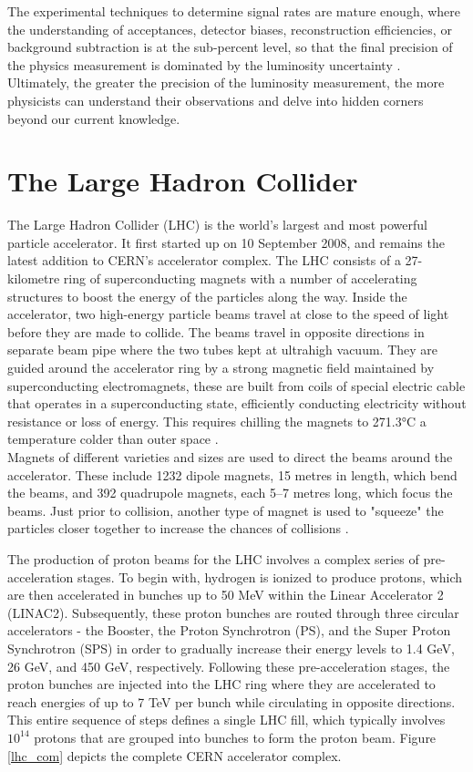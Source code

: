 The experimental techniques to determine signal rates are mature enough, where the understanding of acceptances, detector biases, reconstruction efficiencies, or background subtraction is at the sub-percent level, so that the final precision of the physics measurement is dominated by the luminosity uncertainty \cite{lumi_paper_def_and_concept}.\\
Ultimately, the greater the precision of the luminosity measurement, the more physicists can understand their observations and delve into hidden corners beyond our current knowledge.

\section{The Large Hadron Collider}

The Large Hadron Collider (LHC) is the world’s largest and most powerful particle accelerator. It first started up on 10 September 2008, and remains the latest addition to CERN’s accelerator complex. The LHC consists of a 27-kilometre ring of superconducting magnets with a number of accelerating structures to boost the energy of the particles along the way. Inside the accelerator, two high-energy particle beams travel at close to the speed of light before they are made to collide. The beams travel in opposite directions in separate beam pipe where the two tubes kept at ultrahigh vacuum. They are guided around the accelerator ring by a strong magnetic field maintained by superconducting electromagnets, these are built from coils of special electric cable that operates in a superconducting state, efficiently conducting electricity without resistance or loss of energy. This requires chilling the magnets to 271.3°C  a temperature colder than outer space \cite{LHC}.\\ 
Magnets of different varieties and sizes are used to direct the beams around the accelerator. These include 1232 dipole magnets, 15 metres in length, which bend the beams, and 392 quadrupole magnets, each 5–7 metres long, which focus the beams. Just prior to collision, another type of magnet is used to "squeeze" the particles closer together to increase the chances of collisions . 

The production of proton beams for the LHC involves a complex series of pre-acceleration stages. To begin with, hydrogen is ionized to produce protons, which are then accelerated in bunches up to 50 MeV within the Linear Accelerator 2 (LINAC2). Subsequently, these proton bunches are routed through three circular accelerators - the Booster, the Proton Synchrotron (PS), and the Super Proton Synchrotron (SPS)  in order to gradually increase their energy levels to 1.4 GeV, 26 GeV, and 450 GeV, respectively. Following these pre-acceleration stages, the proton bunches are injected into the LHC ring where they are accelerated to reach energies of up to 7 TeV per bunch while circulating in opposite directions. This entire sequence of steps defines a single LHC fill, which typically involves $10^{14}$ protons that are grouped into bunches to form the proton beam. Figure \ref{lhc_com} depicts the complete CERN accelerator complex.

